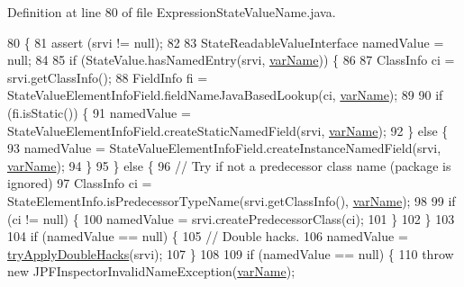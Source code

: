 Definition at line 80 of file Expression\+State\+Value\+Name.\+java.


\begin{DoxyCode}
80                                                                                                            
                    \{
81     assert (srvi != null);
82 
83     StateReadableValueInterface namedValue = null;
84 
85     \textcolor{keywordflow}{if} (StateValue.hasNamedEntry(srvi, \hyperlink{classgov_1_1nasa_1_1jpf_1_1inspector_1_1server_1_1expression_1_1expressions_1_1_expression_state_value_name_a5861f8633f2b17e241b6c108a5671be3}{varName})) \{
86 
87       ClassInfo ci = srvi.getClassInfo();
88       FieldInfo fi = StateValueElementInfoField.fieldNameJavaBasedLookup(ci, 
      \hyperlink{classgov_1_1nasa_1_1jpf_1_1inspector_1_1server_1_1expression_1_1expressions_1_1_expression_state_value_name_a5861f8633f2b17e241b6c108a5671be3}{varName});
89 
90       \textcolor{keywordflow}{if} (fi.isStatic()) \{
91         namedValue = StateValueElementInfoField.createStaticNamedField(srvi, 
      \hyperlink{classgov_1_1nasa_1_1jpf_1_1inspector_1_1server_1_1expression_1_1expressions_1_1_expression_state_value_name_a5861f8633f2b17e241b6c108a5671be3}{varName});
92       \} \textcolor{keywordflow}{else} \{
93         namedValue = StateValueElementInfoField.createInstanceNamedField(srvi, 
      \hyperlink{classgov_1_1nasa_1_1jpf_1_1inspector_1_1server_1_1expression_1_1expressions_1_1_expression_state_value_name_a5861f8633f2b17e241b6c108a5671be3}{varName});
94       \}
95     \} \textcolor{keywordflow}{else} \{
96       \textcolor{comment}{// Try if not a predecessor class name (package is ignored)}
97       ClassInfo ci = StateElementInfo.isPredecessorTypeName(srvi.getClassInfo(), 
      \hyperlink{classgov_1_1nasa_1_1jpf_1_1inspector_1_1server_1_1expression_1_1expressions_1_1_expression_state_value_name_a5861f8633f2b17e241b6c108a5671be3}{varName});
98 
99       \textcolor{keywordflow}{if} (ci != null) \{
100         namedValue = srvi.createPredecessorClass(ci);
101       \}
102     \}
103 
104     \textcolor{keywordflow}{if} (namedValue == null) \{
105       \textcolor{comment}{// Double hacks.}
106       namedValue = \hyperlink{classgov_1_1nasa_1_1jpf_1_1inspector_1_1server_1_1expression_1_1expressions_1_1_expression_state_value_name_a31818b0fc77a1e9504c48d24dffcbd59}{tryApplyDoubleHacks}(srvi);
107     \}
108 
109     \textcolor{keywordflow}{if} (namedValue == null) \{
110       \textcolor{keywordflow}{throw} \textcolor{keyword}{new} JPFInspectorInvalidNameException(\hyperlink{classgov_1_1nasa_1_1jpf_1_1inspector_1_1server_1_1expression_1_1expressions_1_1_expression_state_value_name_a5861f8633f2b17e241b6c108a5671be3}{varName});

\end{DoxyCode}
